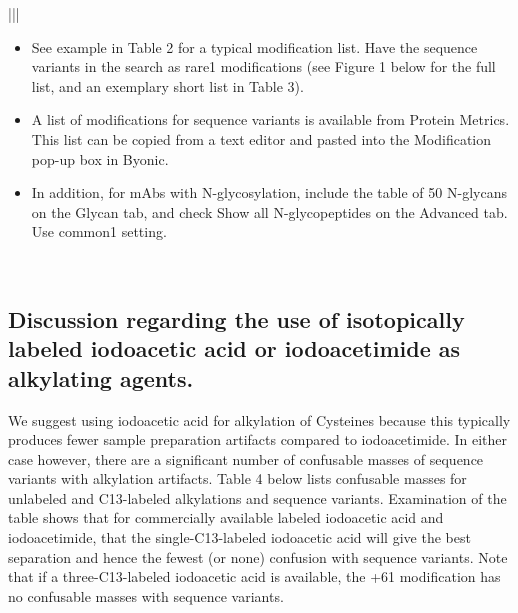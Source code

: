\documentclass[letterpaper,10pt,oneside,english]{sphinxmanual}
\begin{document}
\begin{savenotes}
\begin{tabular}[t]{|||}
\begin{itemize}
\item {} 
See example in Table 2 for a typical modification list.  Have the sequence variants in the search as rare1 modifications (see Figure 1 below for the full list, and an exemplary short list in Table 3).

\item {} 
A list of modifications for sequence variants is available from Protein Metrics.  This list can be copied from a text editor and pasted into the Modification pop-up box in Byonic.

\item {} 
In addition, for mAbs with N-glycosylation, include the table of 50 N-glycans on the Glycan tab, and check Show all N-glycopeptides on the Advanced tab. Use common1 setting.

\end{itemize}
\\
\hline
\end{tabular}
\par
\sphinxattableend\end{savenotes}


\subsection{Discussion regarding the use of isotopically labeled iodoacetic acid or iodoacetimide as alkylating agents.}
\label{\detokenize{applicationnote:discussion-regarding-the-use-of-isotopically-labeled-iodoacetic-acid-or-iodoacetimide-as-alkylating-agents}}
We suggest using iodoacetic acid for alkylation of Cysteines because this typically produces fewer sample preparation artifacts compared to iodoacetimide.  In either case however, there are a significant number of confusable masses of sequence variants with alkylation artifacts.  Table 4 below lists confusable masses for unlabeled and C13-labeled alkylations and sequence variants.  Examination of the table shows that for commercially available labeled iodoacetic acid and iodoacetimide, that the single-C13-labeled iodoacetic acid will give the best separation and hence the fewest (or none) confusion with sequence variants.  Note that if a three-C13-labeled iodoacetic acid is available, the +61 modification has no confusable masses with sequence variants.

\begin{figure}[H]
\centering

\noindent{}
\end{figure}
\end{document}
